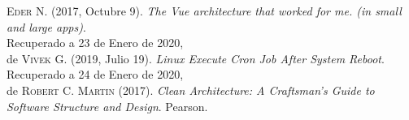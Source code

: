 \documentclass[openright,twoside,10pt]{book}
\begin{document}
\begin{thebibliography}{X}
\textsc{Eder N.} (2017, Octubre 9). \textit{The Vue architecture that worked for me. (in small and large apps)}.
\\Recuperado a 23 de Enero de 2020, \\de \href{https://medium.com/@ederng/the-vue-architecture-that-worked-for-me-in-small-and-large-apps-9b253cf92951}

\textsc{Vivek G.} (2019, Julio 19). \textit{Linux Execute Cron Job After System Reboot}.
\\Recuperado a 24 de Enero de 2020, \\de \href{https://www.cyberciti.biz/faq/linux-execute-cron-job-after-system-reboot/}

\textsc{Robert C. Martin} (2017). \textit{Clean Architecture: A Craftsman's Guide to Software Structure and Design}. Pearson.

\end{thebibliography}
\end{document}
